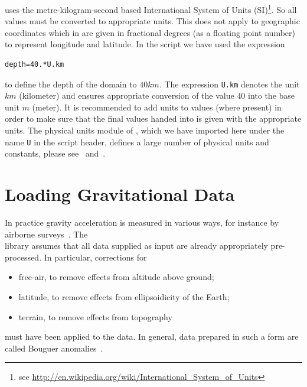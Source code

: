 \downunder uses the metre-kilogram-second based International System of Units
(SI)\footnote{see \url{http://en.wikipedia.org/wiki/International_System_of_Units}}.
So all values must be converted to appropriate units.
This does not apply to geographic coordinates which in  are given in
fractional degrees (as a floating point number) to represent longitude and
latitude. In the script we have used the expression
\begin{verbatim}
depth=40.*U.km
\end{verbatim}
to define the depth of the domain to $40 km$.
The expression \verb|U.km| denotes the unit $km$ (kilometer) and ensures
appropriate conversion of the value $40$ into the base unit $m$ (meter).
It is recommended to add units to values (where present) in order to make sure
that the final values handed into \downunder is given with the appropriate
units.
The physical units module of \escript, which we have imported here under the
name \verb|U| in the script header, defines a large number of physical units
and constants, please see~\cite{ESCRIPT} and~\cite{ESCRIPTONLINE}. 

\section{Loading Gravitational Data}\label{SEC:P1:GRAV:DATA}
In practice gravity acceleration is measured in various ways, for instance by
airborne surveys~\cite{Telford1990a}.
The\\ \downunder library assumes that all data supplied as input are already appropriately
pre-processed. In particular, corrections for
\begin{itemize}
 \item free-air, to remove effects from altitude above ground;
 \item latitude, to remove effects from ellipsoidicity of the Earth;
 \item terrain, to remove effects from topography
\end{itemize}
must have been applied to the data.
In general, data prepared in such a form are called Bouguer anomalies~\cite{Telford1990a}.

